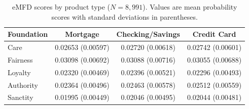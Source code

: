 
\begin{table}[H]
\centering
\caption{eMFD scores by product type ($N = 8{,}991$). Values are mean probability scores with standard deviations in parentheses.}
\label{tab:supp_emfd_product}
\begin{tabular}{lccc}
\toprule
Foundation & Mortgage & Checking/Savings & Credit Card \\
\midrule
Care      & 0.02653 (0.00597) & 0.02720 (0.00618) & 0.02742 (0.00601) \\
Fairness  & 0.03098 (0.00692) & 0.03088 (0.00716) & 0.03055 (0.00688) \\
Loyalty   & 0.02320 (0.00469) & 0.02396 (0.00521) & 0.02296 (0.00493) \\
Authority & 0.02364 (0.00496) & 0.02463 (0.00578) & 0.02512 (0.00559) \\
Sanctity  & 0.01995 (0.00449) & 0.02046 (0.00495) & 0.02044 (0.00481) \\
\bottomrule
\end{tabular}
\end{table}


